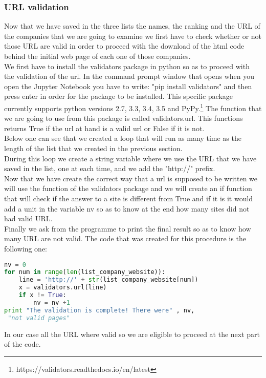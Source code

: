 \documentclass{article}
\begin{document}
\subsubsection{URL validation}
Now that we have saved in the three lists the names, the ranking and the URL of the companies that we are going to examine we first have to check whether or not those URL are valid in order to proceed with the download of the html code behind the initial web page of each one of those companies.\\
We first have to install the validators package in python so as to proceed with the validation of the url. In the command prompt window that opens when you open the Jupyter Notebook you have to write: "pip install validators" and then press enter in order for the package to be installed. This specific package currently supports python versions 2.7, 3.3, 3.4, 3.5 and PyPy.\footnote{https://validators.readthedocs.io/en/latest} 
The function that we are going to use from this package is called validators.url. This functions returns True if the url at hand is a valid url or False if it is not.\\
Below one can see that we created a loop that will run as many time as the length of the list that we created in the previous section.\\
During this loop we create a string variable where we use the URL that we have saved in the list, one at each time, and we add the "http://" prefix.\\
Now that we have create the correct way that a url is supposed to be written we will use the function of the validators package and we will create an if function that will check if the answer to a site is different from True and if it is it would add a unit in the variable nv so as to know at the end how many sites did not had valid URL.\\
Finally we ask from the programme to print the final result so as to know how many URL are not valid. The code that was created for this procedure is the following one:
\begin{lstlisting}[language=Python]
nv = 0
for num in range(len(list_company_website)):
    line = 'http://' + str(list_company_website[num])
    x = validators.url(line)    
    if x != True:
        nv = nv +1
print "The validation is complete! There were" , nv,
 "not valid pages"
\end{lstlisting}
In our case all the URL where valid so we are eligible to proceed at the next part of the code.
\end{document}
